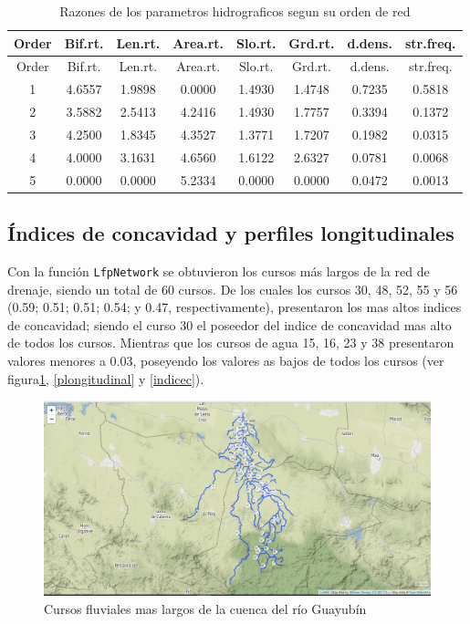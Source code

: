 \documentclass[11pt,]{article}
\begin{document}
\begin{longtable}[]{@{}cccccccc@{}}
\caption{\label{razones} Razones de los parametros hidrograficos segun
su orden de red}\tabularnewline
\toprule
Order & Bif.rt. & Len.rt. & Area.rt. & Slo.rt. & Grd.rt. & d.dens. &
str.freq.\tabularnewline
\midrule
\endfirsthead
\toprule
Order & Bif.rt. & Len.rt. & Area.rt. & Slo.rt. & Grd.rt. & d.dens. &
str.freq.\tabularnewline
\midrule
\endhead
1 & 4.6557 & 1.9898 & 0.0000 & 1.4930 & 1.4748 & 0.7235 &
0.5818\tabularnewline
2 & 3.5882 & 2.5413 & 4.2416 & 1.4930 & 1.7757 & 0.3394 &
0.1372\tabularnewline
3 & 4.2500 & 1.8345 & 4.3527 & 1.3771 & 1.7207 & 0.1982 &
0.0315\tabularnewline
4 & 4.0000 & 3.1631 & 4.6560 & 1.6122 & 2.6327 & 0.0781 &
0.0068\tabularnewline
5 & 0.0000 & 0.0000 & 5.2334 & 0.0000 & 0.0000 & 0.0472 &
0.0013\tabularnewline
\bottomrule
\end{longtable}

\subsection{Índices de concavidad y perfiles
longitudinales}\label{uxedndices-de-concavidad-y-perfiles-longitudinales}

Con la función \texttt{LfpNetwork} se obtuvieron los cursos más largos
de la red de drenaje, siendo un total de 60 cursos. De los cuales los
cursos 30, 48, 52, 55 y 56 (0.59; 0.51; 0.51; 0.54; y 0.47,
respectivamente), presentaron los mas altos indices de concavidad;
siendo el curso 30 el poseedor del indice de concavidad mas alto de
todos los cursos. Mientras que los cursos de agua 15, 16, 23 y 38
presentaron valores menores a 0.03, poseyendo los valores as bajos de
todos los cursos (ver figura\ref{lfpnet}, \ref{plongitudinal} y
\ref{indicec}).

\begin{figure}
\centering
\includegraphics[width=1.00000\textwidth]{cursos mas largos.png}
\caption{Cursos fluviales mas largos de la cuenca del río
Guayubín\label{lfpnet}}
\end{figure}
\end{document}
